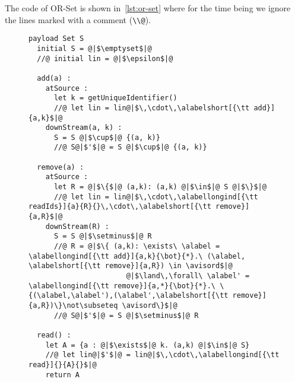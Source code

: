 The code of OR-Set is shown in~\autoref{lst:or-set} where for the time
being we ignore the lines marked with a comment (\lstinline|\\@|).



\begin{figure}[!t]
  \centering
\begin{lstlisting}[caption={Pseudo-code of the OR-Set CRDT},
captionpos=b,label={lst:or-set}] 
  payload Set S 
  initial S = @|$\emptyset$|@ 
  //@ initial lin = @|$\epsilon$|@

  add(a) :
    atSource :
      let k = getUniqueIdentifier()
      //@ let lin = lin@|$\,\cdot\,\alabelshort[{\tt add}]{a,k}$|@
    downStream(a, k) :
      S = S @|$\cup$|@ {(a, k)}
      //@ S@|$'$|@ = S @|$\cup$|@ {(a, k)}

  remove(a) :
    atSource :
      let R = @|$\{$|@ (a,k): (a,k) @|$\in$|@ S @|$\}$|@
      //@ let lin = lin@|$\,\cdot\,\alabellongind[{\tt readIds}]{a}{R}{}\,\cdot\,\alabelshort[{\tt remove}]{a,R}$|@
    downStream(R) :
      S = S @|$\setminus$|@ R
      //@ R = @|$\{ (a,k): \exists\ \alabel = \alabellongind[{\tt add}]{a,k}{\bot}{*}.\ (\alabel, \alabelshort[{\tt remove}]{a,R}) \in \avisord$|@
                       @|$\land\,\forall\ \alabel' = \alabellongind[{\tt remove}]{a,*}{\bot}{*}.\ \{(\alabel,\alabel'),(\alabel',\alabelshort[{\tt remove}]{a,R})\}\not\subseteq \avisord\}$|@
      //@ S@|$'$|@ = S @|$\setminus$|@ R

  read() :
    let A = {a : @|$\exists$|@ k. (a,k) @|$\in$|@ S}
    //@ let lin@|$'$|@ = lin@|$\,\cdot\,\alabellongind[{\tt read}]{}{A}{}$|@
    return A
\end{lstlisting}
\end{figure}

